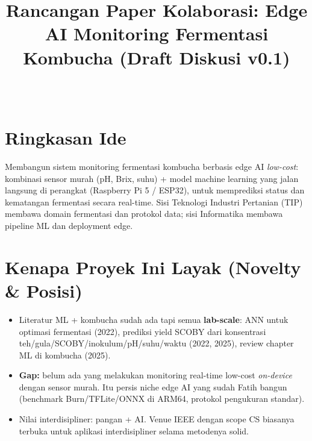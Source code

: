 \documentclass[conference]{IEEEtran}
\begin{document}
\onecolumn

\title{Rancangan Paper Kolaborasi: Edge AI Monitoring Fermentasi Kombucha (Draft Diskusi v0.1)}
\author{\\
}
\maketitle

\section{Ringkasan Ide}
Membangun sistem monitoring fermentasi kombucha berbasis edge AI \emph{low-cost}: kombinasi sensor murah (pH, Brix, suhu) + model machine learning yang jalan langsung di perangkat (Raspberry Pi 5 / ESP32), untuk memprediksi status dan kematangan fermentasi secara real-time. Sisi Teknologi Industri Pertanian (TIP) membawa domain fermentasi dan protokol data; sisi Informatika membawa pipeline ML dan deployment edge.

\section{Kenapa Proyek Ini Layak (Novelty \& Posisi)}
\begin{itemize}
    \item Literatur ML + kombucha sudah ada tapi semua \textbf{lab-scale}: ANN untuk optimasi fermentasi (2022), prediksi yield SCOBY dari konsentrasi teh/gula/SCOBY/inokulum/pH/suhu/waktu (2022, 2025), review chapter ML di kombucha (2025).
    \item \textbf{Gap:} belum ada yang melakukan monitoring real-time low-cost \emph{on-device} dengan sensor murah. Itu persis niche edge AI yang sudah Fatih bangun (benchmark Burn/TFLite/ONNX di ARM64, protokol pengukuran standar).
    \item Nilai interdisipliner: pangan + AI. Venue IEEE dengan scope CS biasanya terbuka untuk aplikasi interdisipliner selama metodenya solid.
\end{itemize}
\end{document}
